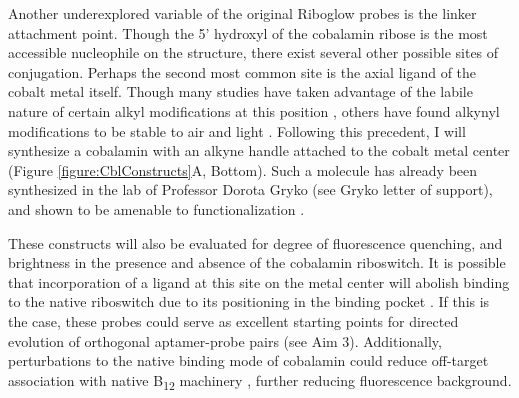 Another underexplored variable of the original Riboglow probes is the linker attachment point.
Though the 5' hydroxyl of the cobalamin ribose is the most accessible nucleophile on the structure, there exist several other possible sites of conjugation.
Perhaps the second most common site is the axial ligand of the cobalt metal itself.
Though many studies have taken advantage of the labile nature of certain alkyl modifications at this position \cite{ShellVitaminB12Tunable2015}, others have found alkynyl modifications to be stable to air and light \cite{ChrominskiReductionfreesynthesisstable2013,RuetzMarkusPhenylethynylcobalaminLightStable2013}.
Following this precedent, I will synthesize a cobalamin with an alkyne handle attached to the cobalt metal center (Figure \ref{figure:CblConstructs}A, Bottom).
Such a molecule has already been synthesized in the lab of Professor Dorota Gryko (see Gryko letter of support), and shown to be amenable to functionalization \cite{ChrominskiVitaminB12Derivatives2014}.

These constructs will also be evaluated for degree of fluorescence quenching, and brightness in the presence and absence of the cobalamin riboswitch.
It is possible that incorporation of a ligand at this site on the metal center will abolish binding to the native riboswitch due to its positioning in the binding pocket \cite{JohnsonJrB12cofactorsdirectly2012}.
If this is the case, these probes could serve as excellent starting points for directed evolution of orthogonal aptamer-probe pairs (see Aim 3).
Additionally, perturbations to the native binding mode of cobalamin could reduce off-target association with native B\textsubscript{12} machinery \cite{PathareSynthesisCobalaminBiotin1996}, further reducing fluorescence background.

